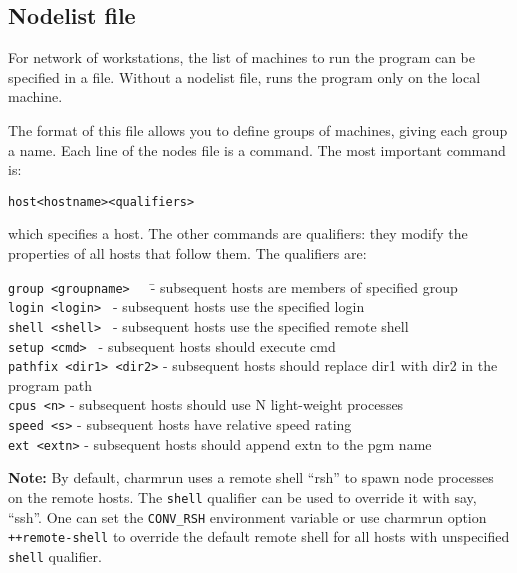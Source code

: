 \subsection{Nodelist file}

For network of workstations,
the list of machines to run the program can be specified in a file.  
Without a nodelist file, \charmpp{} runs the program only on the 
local machine.

The format of this file
allows you to define groups of machines, giving each group a name.
Each line of the nodes file is a command.  The most important command
is:

\begin{alltt}
host <hostname> <qualifiers>
\end{alltt}

which specifies a host.  The other commands are qualifiers: they modify
the properties of all hosts that follow them.  The qualifiers are:


\begin{tabbing}
{\tt group <groupname>}~~~\= - subsequent hosts are members of specified group\\
{\tt login <login>  }     \> - subsequent hosts use the specified login\\
{\tt shell <shell>  }     \> - subsequent hosts use the specified remote 
shell\\
{\tt setup <cmd>  }       \> - subsequent hosts should execute cmd\\
{\tt pathfix <dir1> <dir2>}         \> - subsequent hosts should replace dir1 with dir2 in the program path\\
{\tt cpus <n>}            \> - subsequent hosts should use N light-weight processes\\
{\tt speed <s>}           \> - subsequent hosts have relative speed rating\\
{\tt ext <extn>}          \> - subsequent hosts should append extn to the pgm name\\
\end{tabbing}

{\bf Note:}
By default, charmrun uses a remote shell ``rsh'' to spawn node processes
on the remote hosts. The {\tt shell} qualifier can be used to override
it with say, ``ssh''. One can set the {\tt CONV\_RSH} environment variable
or use charmrun option {\tt ++remote-shell} to override the default remote 
shell for all hosts with unspecified {\tt shell} qualifier.

